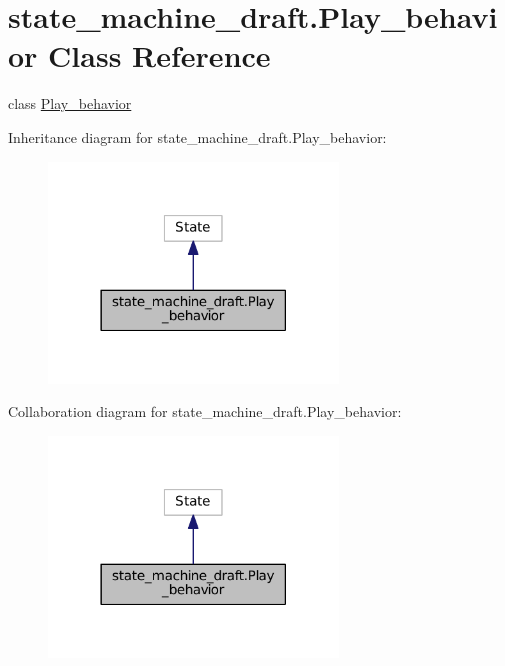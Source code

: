 \hypertarget{classstate__machine__draft_1_1Play__behavior}{}\section{state\+\_\+machine\+\_\+draft.\+Play\+\_\+behavior Class Reference}
\label{classstate__machine__draft_1_1Play__behavior}


class \hyperlink{classstate__machine__draft_1_1Play__behavior}{Play\+\_\+behavior}  




Inheritance diagram for state\+\_\+machine\+\_\+draft.\+Play\+\_\+behavior\+:
\nopagebreak
\begin{figure}[H]
\begin{center}
\leavevmode
\includegraphics[width=218pt]{classstate__machine__draft_1_1Play__behavior__inherit__graph}
\end{center}
\end{figure}


Collaboration diagram for state\+\_\+machine\+\_\+draft.\+Play\+\_\+behavior\+:
\nopagebreak
\begin{figure}[H]
\begin{center}
\leavevmode
\includegraphics[width=218pt]{classstate__machine__draft_1_1Play__behavior__coll__graph}
\end{center}
\end{figure}
